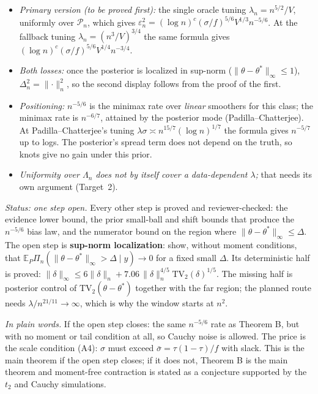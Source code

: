 \documentclass[11pt]{article}
\newcommand{\E}{\mathbb{E}}
\newcommand{\norm}[1]{\lVert #1\rVert}
\newcommand{\TV}{\mathrm{TV}}
\newcommand{\sbar}{\bar\sigma}
\newcommand{\Pn}{\mathcal{P}_n}
\newcommand{\Post}{\Pi_n}
\theoremstyle{plain}
\theoremstyle{definition}
\theoremstyle{remark}
\newcommand{\plainly}[1]{\par\smallskip\noindent\textit{In plain words.} #1\par\smallskip}
\begin{document}
\begin{itemize}
\item \emph{Primary version (to be proved first):} the single oracle tuning $\lambda_n = n^{5/2}/V$, uniformly over $\Pn$, which gives
$\varepsilon_n^2 = (\log n)^c(\sigma/f)^{5/6}V^{1/3}n^{-5/6}$. At the fallback tuning $\lambda_n=(n^3/V)^{3/4}$ the same formula gives $(\log n)^c(\sigma/f)^{5/6}V^{1/4}n^{-3/4}$.
\item \emph{Both losses:} once the posterior is localized in sup-norm ($\norm{\theta-\theta^*}_\infty\le1$), $\Delta_n^2=\norm{\cdot}_n^2$, so the second display follows from the proof of the first.
\item \emph{Positioning:} $n^{-5/6}$ is the minimax rate over \emph{linear} smoothers for this class; the minimax rate is $n^{-6/7}$, attained by the posterior mode (Padilla--Chatterjee). At Padilla--Chatterjee's tuning $\lambda\sigma\asymp n^{15/7}(\log n)^{1/7}$ the formula gives $n^{-5/7}$ up to logs. The posterior's spread term does not depend on the truth, so knots give no gain under this prior.
\item \emph{Uniformity over $\Lambda_n$ does not by itself cover a data-dependent $\lambda$;} that needs its own argument (Target~2).
\end{itemize}

\noindent\textit{Status: one step open.} Every other step is proved and reviewer-checked: the evidence lower bound, the prior small-ball and shift bounds that produce the $n^{-5/6}$ bias law, and the numerator bound on the region where $\norm{\theta-\theta^*}_\infty\le\Delta$. The open step is \textbf{sup-norm localization}: show, without moment conditions, that $\E_P\Post(\norm{\theta-\theta^*}_\infty>\Delta\mid y)\to0$ for a fixed small $\Delta$. Its deterministic half is proved: $\norm{\delta}_\infty\le6\norm{\delta}_n+7.06\,\norm{\delta}_n^{4/5}\TV_2(\delta)^{1/5}$. The missing half is posterior control of $\TV_2(\theta-\theta^*)$ together with the far region; the planned route needs $\lambda/n^{21/11}\to\infty$, which is why the window starts at $n^2$.

\plainly{If the open step closes: the same $n^{-5/6}$ rate as Theorem B, but with no moment or tail condition at all, so Cauchy noise is allowed. The price is the scale condition (A4): $\sigma$ must exceed $\sbar=\tau(1-\tau)/f$ with slack. This is the main theorem if the open step closes; if it does not, Theorem B is the main theorem and moment-free contraction is stated as a conjecture supported by the $t_2$ and Cauchy simulations.}
\end{document}
